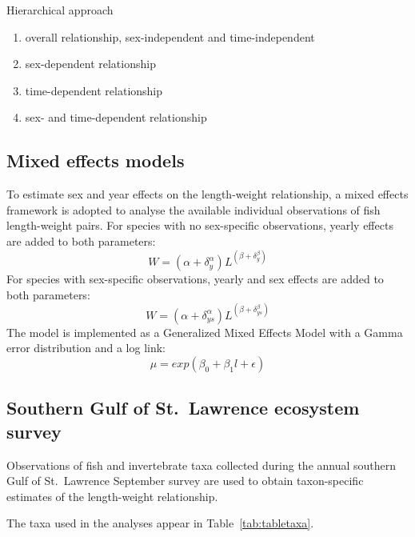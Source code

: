 \documentclass[12pt]{article}\usepackage[]{graphicx}\usepackage[]{color}
\begin{document}
Hierarchical approach
\begin{enumerate}
\def\labelenumi{\arabic{enumi}.}

\item
  overall relationship, sex-independent and time-independent
\item
  sex-dependent relationship
\item
  time-dependent relationship
\item
  sex- and time-dependent relationship
\end{enumerate}
\hypertarget{mixed-effects-models}{%
\subsection{Mixed effects models}\label{mixed-effects-models}}

To estimate sex and year effects on the length-weight relationship, a mixed effects framework is adopted to analyse the available individual observations of fish length-weight pairs. For species with no sex-specific observations, yearly effects are added to both parameters:
\begin{equation}
W =  \left(\alpha +\delta^{\alpha}_{y}\right)L^{\left(\beta +\delta^{\beta}_{y} \right)}
\end{equation}
For species with sex-specific observations, yearly and sex effects are added to both parameters:
\begin{equation}
W =  \left(\alpha +\delta^{\alpha}_{ys}\right)L^{\left(\beta +\delta^{\beta}_{ys} \right)}
\end{equation}
The model is implemented as a Generalized Mixed Effects Model with a Gamma error distribution and a log link:
\begin{equation}
\mu = exp(\beta_{0} + \beta_{1}l + \epsilon)
\end{equation}
\hypertarget{southern-gulf-of-st.-lawrence-ecosystem-survey}{%
\subsection{Southern Gulf of St.~Lawrence ecosystem survey}\label{southern-gulf-of-st.-lawrence-ecosystem-survey}}

Observations of fish and invertebrate taxa collected during the annual southern Gulf of St.~Lawrence September survey are used to obtain taxon-specific estimates of the length-weight relationship.

The taxa used in the analyses appear in Table~\ref{tab:tabletaxa}.
\end{document}
